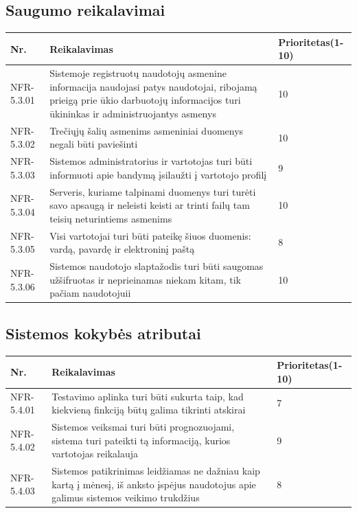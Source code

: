 \documentclass[oneside]{VUMIFPSkursinis}
\begin{document}
\subsection{Saugumo reikalavimai}
\begin{table}[htbp]
	\begin{tabularx}{1\textwidth}{ |P{2.5cm}|X|P{3cm }| }  \hline
		Nr. & Reikalavimas & Prioritetas(1-10) \\ \hline
		NFR-5.3.01 & Sistemoje registruotų naudotojų asmenine informacija naudojasi patys naudotojai, ribojamą prieigą prie ūkio darbuotojų informacijos turi ūkininkas ir administruojantys asmenys & 10 \\ \hline
		NFR-5.3.02 & Trečiųjų šalių asmenims asmeniniai duomenys negali būti paviešinti & 10 \\ \hline
		NFR-5.3.03 & Sistemos administratorius ir vartotojas turi būti informuoti apie bandymą įsilaužti į vartotojo profilį & 9 \\ \hline
		NFR-5.3.04 & Serveris, kuriame talpinami duomenys turi turėti savo apsaugą ir neleisti keisti ar trinti failų tam teisių neturintiems asmenims & 10 \\ \hline
		NFR-5.3.05 & Visi vartotojai turi būti pateikę šiuos duomenis: vardą, pavardę ir elektroninį paštą  & 8 \\ \hline
		NFR-5.3.06 & Sistemos naudotojo slaptažodis turi būti saugomas užšifruotas ir neprieinamas niekam kitam, tik pačiam naudotojuii & 10 \\ \hline
	\end{tabularx}
\end{table}
\subsection{Sistemos kokybės atributai}
\begin{table}[htbp]
	\begin{tabularx}{1\textwidth}{ |P{2.5cm}|X|P{3cm }| }  \hline
		Nr. & Reikalavimas & Prioritetas(1-10) \\ \hline
		NFR-5.4.01 & Testavimo aplinka turi būti sukurta taip, kad kiekvieną finkciją būtų galima tikrinti atskirai & 7 \\ \hline
		NFR-5.4.02 & Sistemos veiksmai turi būti prognozuojami, sistema turi pateikti tą informaciją, kurios vartotojas reikalauja & 9 \\ \hline
		NFR-5.4.03 & Sistemos patikrinimas leidžiamas ne dažniau kaip kartą į mėnesį, iš anksto įspėjus naudotojus apie galimus sistemos veikimo trukdžius  & 8 \\ \hline
	\end{tabularx}
\end{table}
\end{document}
